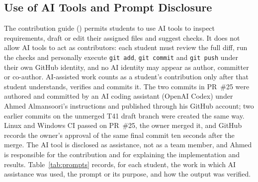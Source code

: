 \subsection{Use of AI Tools and Prompt Disclosure}\label{sec:aiuse}
The contribution guide () permits students to use AI tools to
inspect requirements, draft or edit their assigned files and suggest checks. It
does not allow AI tools to act as contributors: each student must review the full
diff, run the checks and personally execute \texttt{git add}, \texttt{git commit}
and \texttt{git push} under their own GitHub identity, and no AI identity may
appear as author, committer or co-author. AI-assisted work counts as a student's
contribution only after that student understands, verifies and commits it.
The two commits in PR~\#25
were authored and committed by an AI coding assistant (OpenAI Codex) under Ahmed
Almansoori's instructions and published through his GitHub account; two earlier
commits on the unmerged T41 draft branch were created the same way. Linux and
Windows CI passed on PR~\#25, the owner merged it, and GitHub records the owner's
approval of the same final commit ten seconds after the merge. The AI tool is
disclosed as assistance, not as a team member, and Ahmed is responsible for
the contribution and for explaining the implementation and results.
Table~\ref{tab:prompts} records, for each student, the work in which AI
assistance was used, the prompt or its purpose, and how the output was verified.

